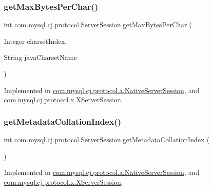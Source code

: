 \subsubsection{\texorpdfstring{get\+Max\+Bytes\+Per\+Char()}{getMaxBytesPerChar()}\hspace{0.1cm}{\footnotesize\ttfamily [2/2]}}
{\footnotesize\ttfamily int com.\+mysql.\+cj.\+protocol.\+Server\+Session.\+get\+Max\+Bytes\+Per\+Char (\begin{DoxyParamCaption}\item[{Integer}]{charset\+Index,  }\item[{String}]{java\+Charset\+Name }\end{DoxyParamCaption})}



Implemented in \mbox{\hyperlink{classcom_1_1mysql_1_1cj_1_1protocol_1_1a_1_1_native_server_session_af9ca6638e8879ecf64d7a09eb70420d4}{com.\+mysql.\+cj.\+protocol.\+a.\+Native\+Server\+Session}}, and \mbox{\hyperlink{classcom_1_1mysql_1_1cj_1_1protocol_1_1x_1_1_x_server_session_ad81f8d89d2f108ebfd67061ce7e1259e}{com.\+mysql.\+cj.\+protocol.\+x.\+X\+Server\+Session}}.

\mbox{\label{interfacecom_1_1mysql_1_1cj_1_1protocol_1_1_server_session_af72447373f7ae77b56c5563c2922e9db}} 
\subsubsection{\texorpdfstring{get\+Metadata\+Collation\+Index()}{getMetadataCollationIndex()}}
{\footnotesize\ttfamily int com.\+mysql.\+cj.\+protocol.\+Server\+Session.\+get\+Metadata\+Collation\+Index (\begin{DoxyParamCaption}{ }\end{DoxyParamCaption})}



Implemented in \mbox{\hyperlink{classcom_1_1mysql_1_1cj_1_1protocol_1_1a_1_1_native_server_session_ab7cb9e9b9e758a4bea17d5a7e3889463}{com.\+mysql.\+cj.\+protocol.\+a.\+Native\+Server\+Session}}, and \mbox{\hyperlink{classcom_1_1mysql_1_1cj_1_1protocol_1_1x_1_1_x_server_session_a09e1089e8ae704f9d38ee7c87ca18d72}{com.\+mysql.\+cj.\+protocol.\+x.\+X\+Server\+Session}}.

